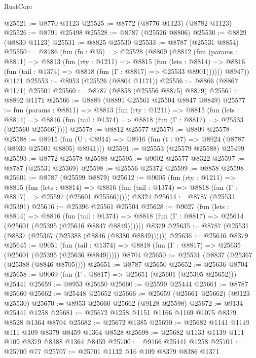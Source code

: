 \begin{lexlean}{RustCore}
\begin{coremodule}
@25521 := @8770 @1123
@25525 := @8772 (@8776 @1123) (@8782 @1123)
@25526 := @8791 @25498
@25528 := @8787 (@25526 @8806)
@25530 := @8829 (@8830 @1123)
@25531 := @8825 @25530
@25533 := @8787 (@25531 @8854)
@25550 := @8786
    (fun (fn : @35) =>
    @25528
      (@8809
        (@8812
          (fun (params : @8811) =>
          @8813
            (fun (rty : @1211) =>
            @8815
              (fun (lets : @8814) =>
              @8816 (fun (tail : @1374) => @8818 (fun (Γ : @8817) => @25533 @8901))))))
        @8947))
    @1171
@25553 := @8953 (@25526 (@8804 @1171))
@25556 := @8866 (@8867 @1171) @25501
@25560 := @8787 (@8858 (@25556 @8875) @8879)
@25561 := @8892 @1171
@25566 := @8889 (@8891 @25561 @25504 @8847 @8849)
@25577 := fun (params : @8811) =>
  @8813
    (fun (rty : @1211) =>
    @8815
      (fun (lets : @8814) =>
      @8816 (fun (tail : @1374) => @8818 (fun (Γ : @8817) => @25533 (@25560 @25566)))))
@25578 := @8812 @25577
@25579 := @8809 @25578
@25588 := @8915
    (fun (U : @8914) => @8916 (fun (t : @7) => @8924 (@8787 (@8930 @25501 @8805) @8941)))
@25591 := @25553 (@25579 @25588) @25499
@25593 := @8772 @25578 @25588
@25595 := @9002 @25577 @8322
@25597 := @8787 (@25531 @25369)
@25598 := @25556 @25372
@25599 := @8858 @25598
@25601 := @8787 (@25599 @8879)
@25612 := @9005
    (fun (rty : @1211) =>
    @8815
      (fun (lets : @8814) =>
      @8816 (fun (tail : @1374) => @8818 (fun (Γ : @8817) => @25597 (@25601 @25566)))))
    @8324
@25614 := @8787 (@25531 @25391)
@25616 := @25396 @25561 @25504
@25628 := @9027
    (fun (lets : @8814) =>
    @8816
      (fun (tail : @1374) =>
      @8818 (fun (Γ : @8817) => @25614 (@25601 (@25395 (@25616 @8847 @8849))))))
    @8379
@25635 := @8787 (@25531 (@8837 (@25367 (@25388 (@8846 (@8380 @8849))))))
@25636 := @25616 @8379
@25645 := @9051
    (fun (tail : @1374) => @8818 (fun (Γ : @8817) => @25635 (@25601 (@25395 (@25636 @8849)))))
    @8704
@25650 := @25531 (@8837 (@25367 (@25388 (@8846 @8705))))
@25651 := @8787 @25650
@25652 := @25636 @8704
@25658 := @9069 (fun (Γ : @8817) => @25651 (@25601 (@25395 @25652))) @25441
@25659 := @8953 @25650
@25660 := @25599 @25444
@25661 := @8787 @25660
@25662 := @25448 @25652
@25666 := @25659 (@25661 @25662) (@9123 @25530)
@25670 := @8953 @25660 @25662 (@9128 @25598)
@25672 := @9134 @25441 @1258
@25681 := @25672 @1258 @1151 @1166 @1169 @1075 @8379 @8528 @1364 @8704
@25682 := @25672 @1385
@25690 := @25682 @1141 @1149 @111 @109 @8379 @8459 @1364 @8528
@25698 := @25682 @1133 @1139 @111 @109 @8379 @8388 @1364 @8459
@25700 := @9166 @25441 @1258
@25701 := @25700 @77
@25707 := @25701 @1132 @16 @109 @8379 @8386 @1371

\end{coremodule}
\end{lexlean}
